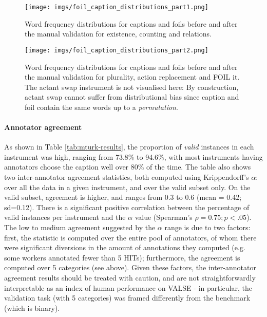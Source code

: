 \documentclass[11pt]{article}
\newcommand{\dataset}{VALSE}
\begin{document}
\begin{figure*}[t]
    \centering
    \texttt{[image: imgs/foil\_caption\_distributions\_part1.png]}
    \caption{Word frequency distributions for captions and foils before and after the manual validation for existence, counting and relations.}
    \label{fig:foil-caption-distr-part1}
\end{figure*}

\begin{figure*}[t]
    \centering
    \texttt{[image: imgs/foil\_caption\_distributions\_part2.png]}
    \caption{Word frequency distributions for captions and foils before and after the manual validation for plurality, action replacement and FOIL it. The actant swap instrument is not visualised here: By construction, actant swap cannot suffer from distributional bias since caption and foil contain the same words up to a \emph{permutation}.}
    \label{fig:foil-caption-distr-part2}
\end{figure*}




\paragraph{Annotator agreement} As shown in Table \ref{tab:mturk-results}, the proportion of {\em valid} instances in each instrument was high, ranging from 73.8\% to 94.6\%, with most instruments having annotators choose the caption well over 80\% of the time. The table also shows two inter-annotator agreement statistics, both computed using Krippendorff's $\alpha$: over all the data in a given instrument, and over the valid subset only. On the valid subset, agreement is higher, and ranges from 0.3 to 0.6 (mean = 0.42; sd=0.12). There is a significant positive correlation between the percentage of valid instances per instrument and the $\alpha$ value (Spearman's $\rho=0.75; p< .05$).  The low to medium agreement suggested by the $\alpha$ range is due to two factors: first, the statistic is computed over the entire pool of annotators, of whom there were significant diversions in the amount of annotations they computed (e.g. some workers annotated fewer than 5 HITs); furthermore, the agreement is computed over 5 categories (see above). Given these factors, the inter-annotator agreement results should be treated with caution, and are not straightforwardly interpretable as an index of human performance on \dataset{} - in particular, the validation task (with 5 categories) was framed differently from the benchmark (which is binary).
\end{document}

